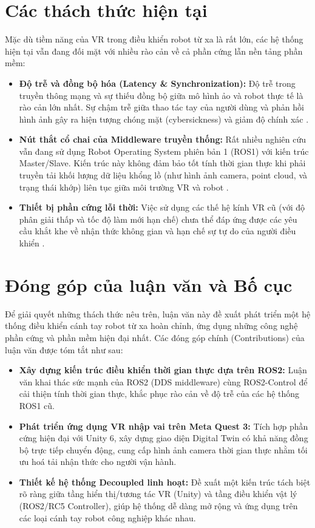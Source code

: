 \section{Các thách thức hiện tại}
Mặc dù tiềm năng của VR trong điều khiển robot từ xa là rất lớn, các hệ thống hiện tại vẫn đang đối mặt với nhiều rào cản về cả phần cứng lẫn nền tảng phần mềm:
\begin{itemize}
    \item \textbf{Độ trễ và đồng bộ hóa (Latency \& Synchronization):} Độ trễ trong truyền thông mạng và sự thiếu đồng bộ giữa mô hình ảo và robot thực tế là rào cản lớn nhất. Sự chậm trễ giữa thao tác tay của người dùng và phản hồi hình ảnh gây ra hiện tượng chóng mặt (cybersickness) và giảm độ chính xác \cite{luu2025enhancing}.
    \item \textbf{Nút thắt cổ chai của Middleware truyền thống:} Rất nhiều nghiên cứu vẫn đang sử dụng Robot Operating System phiên bản 1 (ROS1) với kiến trúc Master/Slave. Kiến trúc này không đảm bảo tốt tính thời gian thực khi phải truyền tải khối lượng dữ liệu khổng lồ (như hình ảnh camera, point cloud, và trạng thái khớp) liên tục giữa môi trường VR và robot \cite{zhang2023research, torrejón2026teleoperation}.
    \item \textbf{Thiết bị phần cứng lỗi thời:} Việc sử dụng các thế hệ kính VR cũ (với độ phân giải thấp và tốc độ làm mới hạn chế) chưa thể đáp ứng được các yêu cầu khắt khe về nhận thức không gian và hạn chế sự tự do của người điều khiển \cite{hetrick2020comparing}.
\end{itemize}

\section{Đóng góp của luận văn và Bố cục}
\label{sec:contributions_outline}
Để giải quyết những thách thức nêu trên, luận văn này đề xuất phát triển một hệ thống điều khiển cánh tay robot từ xa hoàn chỉnh, ứng dụng những công nghệ phần cứng và phần mềm hiện đại nhất. Các đóng góp chính (Contributions) của luận văn được tóm tắt như sau:

\begin{itemize}
    \item \textbf{Xây dựng kiến trúc điều khiển thời gian thực dựa trên ROS2:} Luận văn khai thác sức mạnh của ROS2 (DDS middleware) cùng ROS2-Control để cải thiện tính thời gian thực, khắc phục rào cản về độ trễ của các hệ thống ROS1 cũ.
    \item \textbf{Phát triển ứng dụng VR nhập vai trên Meta Quest 3:} Tích hợp phần cứng hiện đại với Unity 6, xây dựng giao diện Digital Twin có khả năng đồng bộ trực tiếp chuyển động, cung cấp hình ảnh camera thời gian thực nhằm tối ưu hoá tải nhận thức cho người vận hành.
    \item \textbf{Thiết kế hệ thống Decoupled linh hoạt:} Đề xuất một kiến trúc tách biệt rõ ràng giữa tầng hiển thị/tương tác VR (Unity) và tầng điều khiển vật lý (ROS2/RC5 Controller), giúp hệ thống dễ dàng mở rộng và ứng dụng trên các loại cánh tay robot công nghiệp khác nhau.
\end{itemize}

